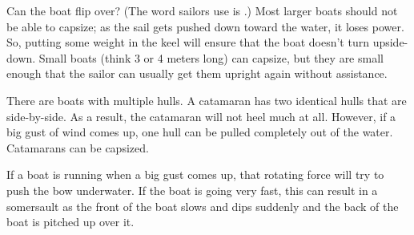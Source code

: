 Can the boat flip over?  (The word sailors use is .)  Most larger boats should not be able to capsize; as the sail gets pushed down toward the water, it loses power.  So, putting some weight in the keel will ensure that the boat doesn't turn upside-down.  Small boats (think 3 or 4 meters long) can capsize,  but they are small enough that the sailor can usually
get them upright again without assistance.

There are boats with multiple hulls. A catamaran has two identical hulls that are side-by-side.  As a result,  the catamaran will not heel much at all.  However,  if a big gust of wind comes up, one hull can be pulled completely out of the water.  Catamarans can be capsized.

If a boat is running when a big gust comes up,  that rotating force will try to push the bow underwater. If the boat is going very fast,  this can result in a somersault as 
the front of the boat slows and dips suddenly and the back of the boat is pitched up over it.


